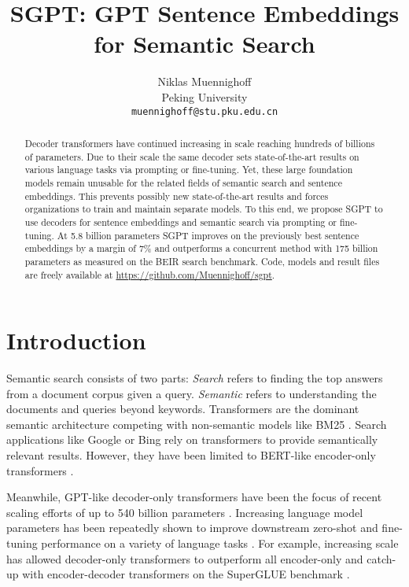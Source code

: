\documentclass{article}
\title{SGPT: GPT Sentence Embeddings for Semantic Search}
\author{
  Niklas Muennighoff \\
  Peking University \\
  \texttt{muennighoff@stu.pku.edu.cn} \\
}
\begin{document}
\maketitle

\begin{abstract}

Decoder transformers have continued increasing in scale reaching hundreds of billions of parameters. Due to their scale the same decoder sets state-of-the-art results on various language tasks via prompting or fine-tuning. Yet, these large foundation models remain unusable for the related fields of semantic search and sentence embeddings. This prevents possibly new state-of-the-art results and forces organizations to train and maintain separate models. To this end, we propose SGPT to use decoders for sentence embeddings and semantic search via prompting or fine-tuning. At 5.8 billion parameters SGPT improves on the previously best sentence embeddings by a margin of 7\% and outperforms a concurrent method with 175 billion parameters as measured on the BEIR search benchmark. Code, models and result files are freely available at \url{https://github.com/Muennighoff/sgpt}.













\end{abstract}


\section{Introduction}

Semantic search consists of two parts: \textit{Search} refers to finding the top  answers from a document corpus given a query. \textit{Semantic} refers to understanding the documents and queries beyond keywords. Transformers \citep{vaswani2017attention} are the dominant semantic architecture \cite{cer2018universal, thakur2021beir} competing with non-semantic models like BM25 \cite{robertson2009probabilistic}. Search applications like Google \cite{nayak2021google} or Bing \cite{zhu2021bing} rely on transformers to provide semantically relevant results. However, they have been limited to BERT-like encoder-only transformers \cite{nayak2021google, zhu2021bing, devlin2018bert, reimers2019sentence, formal2021splade, ni2021large}.

Meanwhile, GPT-like decoder-only transformers \cite{radford2018improving} have been the focus of recent scaling efforts of up to 540 billion parameters \cite{chowdhery2022palm}. Increasing language model parameters has been repeatedly shown to improve downstream zero-shot and fine-tuning performance on a variety of language tasks \cite{brown2020language, rae2021scaling, chowdhery2022palm}. For example, increasing scale has allowed decoder-only transformers to outperform all encoder-only and catch-up with encoder-decoder transformers on the SuperGLUE benchmark \cite{wang2019superglue, chowdhery2022palm}.
\end{document}
